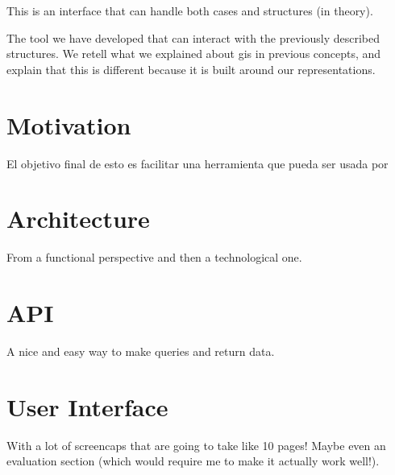 	This is an interface that can handle both cases and structures (in theory).
	
	The tool we have developed that can interact with the previously described structures. We retell what we explained about \gls{gis} in previous concepts, and explain that this is different because it is built around our representations.
	
	\section{Motivation}
	El objetivo final de esto es facilitar una herramienta que pueda ser usada por 
	
	\section{Architecture}
	From a functional perspective and then a technological one.
	
	\section{API}
	A nice and easy way to make queries and return data.
	
	\section{User Interface}
	With a lot of screencaps that are going to take like 10 pages! Maybe even an evaluation section (which would require me to make it actually work well!).